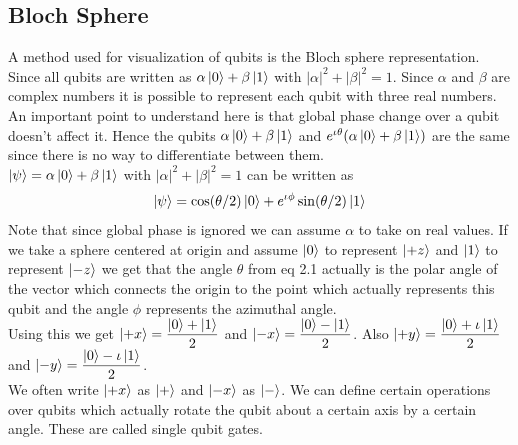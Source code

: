 \documentclass{report}
\begin{document}
\subsection{Bloch Sphere}
A method used for visualization of qubits is the Bloch sphere representation. Since all qubits are written as $\alpha\ket{0} + \beta\ket{1}$ with $|\alpha|^2 + |\beta|^2 = 1$. 
Since $\alpha$ and $\beta$ are complex numbers it is possible to represent each qubit with three real numbers. An important point to understand here is that global phase change over a qubit doesn't affect it. 
Hence the qubits $\alpha\ket{0} + \beta\ket{1}$ and $e^{\iota\theta}(\alpha\ket{0} + \beta\ket{1})$ are the same since there is no way to differentiate between them.\\
$\ket{\psi} = \alpha\ket{0} + \beta\ket{1}$ with $|\alpha|^2 + |\beta|^2 = 1$ can be written as\\
\begin{equation}\ket{\psi} = \cos(\theta/2)\ket{0} + e^{\iota\phi}\sin(\theta/2)\ket{1}\end{equation}
Note that since global phase is ignored we can assume $\alpha$ to take on real values.
If we take a sphere centered at origin and assume $\ket{0}$ to represent $\ket{+z}$ and $\ket{1}$ to represent $\ket{-z}$ we get that the angle $\theta$ from eq 2.1 actually is the polar angle of the vector which connects the origin to the point which actually represents this qubit and the angle $\phi$ represents the azimuthal angle.\\
Using this we get $\ket{+x} = \dfrac{\ket{0} + \ket{1}}{2}$ and $\ket{-x} = \dfrac{\ket{0} - \ket{1}}{2}$.
Also $\ket{+y} = \dfrac{\ket{0} + \iota\ket{1}}{2}$ and $\ket{-y} = \dfrac{\ket{0} - \iota\ket{1}}{2}$.\\
We often write $\ket{+x}$ as $\ket{+}$ and $\ket{-x}$ as $\ket{-}$.
We can define certain operations over qubits which actually rotate the qubit about a certain axis by a certain angle. These are called single qubit gates.\\
\end{document}
